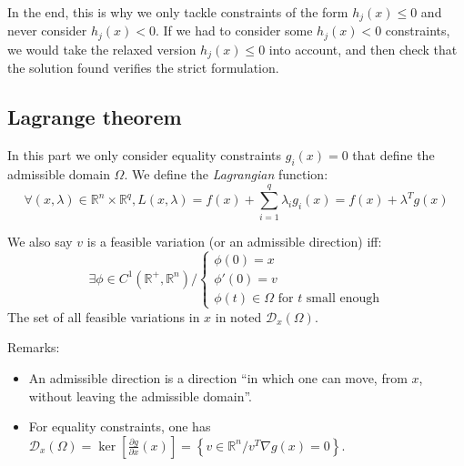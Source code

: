 \documentclass{article}
\begin{document}
\noindent In the end, this is why we only tackle constraints of the form $h_j(x)\leq 0$ and never consider $h_j(x)<0$. If we had to consider some $h_j(x)<0$ constraints, we would take the relaxed version $h_j(x)\leq 0$ into account, and then check that the solution found verifies the strict formulation.

\subsection{Lagrange theorem}

In this part we only consider equality constraints $g_i(x)=0$ that define the admissible domain $\Omega$. We define the \emph{Lagrangian} function:
\begin{equation*}
\forall (x,\lambda)\in \mathbb{R}^n \times \mathbb{R}^q, L(x,\lambda) = f(x) +
\sum\limits_{i=1}^q \lambda_i g_i(x) = f(x) + \lambda^T g(x)
\end{equation*}

\noindent We also say $v$ is a feasible variation (or an admissible direction) iff:
\begin{equation*}
\exists \phi \in C^1(\mathbb{R}^+,\mathbb{R}^n) /
\left\{ \begin{array}{c} \phi(0)=x \\ \phi'(0)=v \\ \phi(t) \in \Omega
\textrm{ for  }t\textrm{ small enough} \end{array}\right.
\end{equation*}
The set of all feasible variations in $x$ in noted $\mathcal{D}_{x}(\Omega)$.

\noindent Remarks:
\begin{itemize}
\item An admissible direction is a direction ``in which one can move, from $x$, without leaving the admissible domain''.
\item For equality constraints, one has $\mathcal{D}_{x}(\Omega) = \ker 
  \left[ \frac{\partial g}{\partial x}(x) \right] = \left\{ v\in
  \mathbb{R}^n / v^T \nabla g(x) = 0 \right\}$.
\end{itemize}
\end{document}

